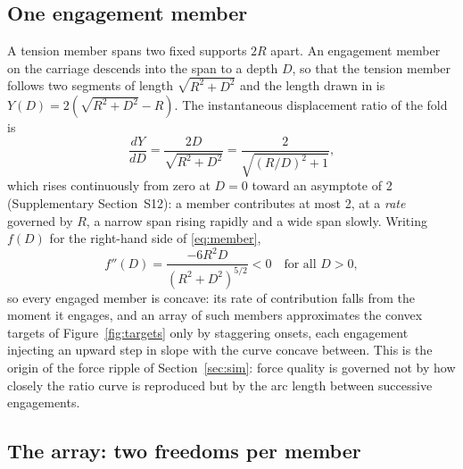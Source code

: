 \documentclass[preprint,12pt,number]{elsarticle}
\begin{document}
\subsection{One engagement member}

A tension member spans two fixed supports $2R$ apart. An engagement member on the carriage descends into the span to a depth $D$, so that the tension member follows two segments of length $\sqrt{R^2 + D^2}$ and the length drawn in is $Y(D) = 2(\sqrt{R^2 + D^2} - R)$. The instantaneous displacement ratio of the fold is
\begin{equation}
\frac{dY}{dD} = \frac{2D}{\sqrt{R^2 + D^2}} = \frac{2}{\sqrt{(R/D)^2 + 1}},
\label{eq:member}
\end{equation}
which rises continuously from zero at $D = 0$ toward an asymptote of 2 (Supplementary Section~S12): a member contributes at most 2, at a \emph{rate} governed by $R$, a narrow span rising rapidly and a wide span slowly. Writing $f(D)$ for the right-hand side of \eqref{eq:member},
\begin{equation}
f''(D) = \frac{-6R^2 D}{(R^2 + D^2)^{5/2}} < 0 \quad \text{for all } D > 0,
\label{eq:concave}
\end{equation}
so every engaged member is concave: its rate of contribution falls from the moment it engages, and an array of such members approximates the convex targets of Figure~\ref{fig:targets} only by staggering onsets, each engagement injecting an upward step in slope with the curve concave between. This is the origin of the force ripple of Section~\ref{sec:sim}: force quality is governed not by how closely the ratio curve is reproduced but by the arc length between successive engagements.

\subsection{The array: two freedoms per member}
\end{document}
